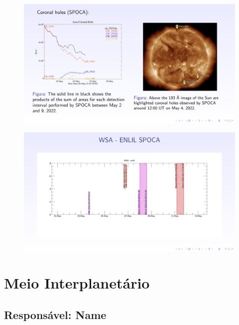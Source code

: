 \documentclass[a4paper, 10pt]{article}
\begin{document}
    \begin{figure}[H]
        \centering
        \includegraphics[width=14cm]{./figures/pt_outfileSun_0.jpg}
    \end{figure} 
 

    
    \begin{figure}[H]
        \centering
        \includegraphics[width=14cm]{./figures/pt_outfileSun_1.jpg}
    \end{figure} 
 

    \section{Meio Interplanetário} 
 \subsection{Responsável: Name} 
 
\end{document}

